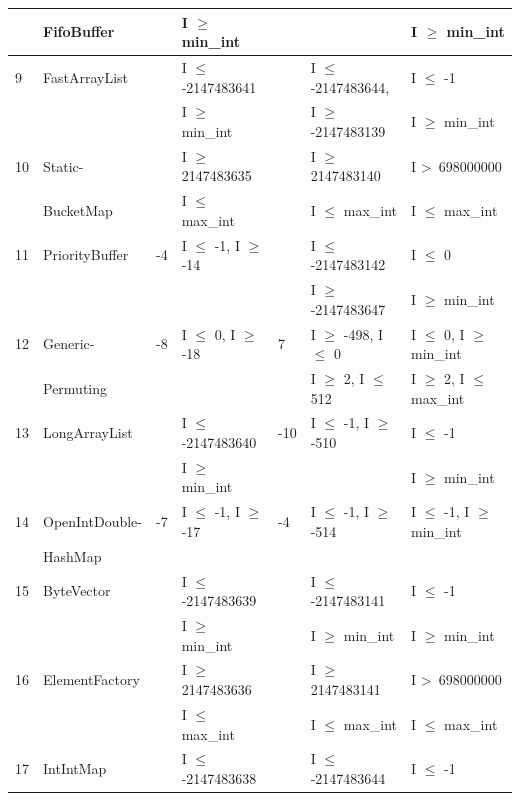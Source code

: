 {\begin{longtable}{|l|l|l|l|l|l|l|}
	& FifoBuffer					&& I $\ge$ min\_int				&& 								& I $\ge$ min\_int				\\	
	\hline
9	& FastArrayList				&& I $\le$ -2147483641 			&& I $\le$ -2147483644, 			& I $\le$ -1								\\ 
	&                                             && I $\ge$ min\_int				&& I $\ge$ -2147483139			& I $\ge$ min\_int				\\	
	\hline
10	& Static-						&& I $\ge$ 2147483635			&& I $\ge$ 2147483140			& I \textgreater~698000000					\\ 
	& BucketMap                           && I $\le$ max\_int				&& I $\le$ max\_int					& I $\le$ max\_int			   		\\	
	\hline
11	& PriorityBuffer				&-4 & I $\le$ -1, I $\ge$ -14		&	& I $\le$  -2147483142			& I $\le$ 0								\\
	&                                             && 								&& I $\ge$ -2147483647			& I $\ge$ min\_int			   	\\	 
	\hline
12	& Generic-					&-8 & I $\le$ 0, I $\ge$ -18		& 7 & I $\ge$ -498, I $\le$ 0			& I $\le$ 0, I $\ge$ min\_int	\\ 	%
	& Permuting                            && 								&& I $\ge$ 2, I $\le$ 512			& I $\ge$ 2, I $\le$ max\_int	\\
	\hline
13	& LongArrayList				&& I $\le$ -2147483640			& -10 & I $\le$ -1, I $\ge$ -510			& I $\le$ -1								\\ 
	&                                             && I $\ge$ min\_int				&& 								& I $\ge$ min\_int				\\
	\hline
14	& OpenIntDouble- 			&-7 & I $\le$ -1, I $\ge$ -17		&-4 & I $\le$ -1, I $\ge$ -514			& I $\le$ -1, I $\ge$ min\_int	\\ 
	& HashMap					&& 								&& 								& 	\\ 
	\hline
15	& ByteVector					&& I $\le$ -2147483639			&& I $\le$ -2147483141			& I $\le$ -1								\\ 	%
	&                                             && I $\ge$ min\_int				&& I $\ge$ min\_int				& I $\ge$ min\_int				\\	
	\hline
16	& ElementFactory				&& I $\ge$ 2147483636			&& I $\ge$ 2147483141			& I \textgreater~698000000					\\ 
	&                                             && I $\le$ max\_int				&& I $\le$ max\_int					& I $\le$ max\_int						\\	
	\hline
17	& IntIntMap					&& I $\le$ -2147483638			&& I $\le$ -2147483644			& I $\le$ -1								\\ 

\end{longtable}}
